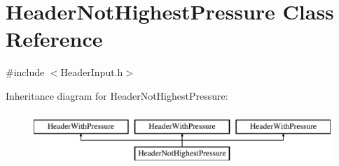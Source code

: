 \hypertarget{class_header_not_highest_pressure}{}\section{Header\+Not\+Highest\+Pressure Class Reference}
\label{class_header_not_highest_pressure}


{\ttfamily \#include $<$Header\+Input.\+h$>$}

Inheritance diagram for Header\+Not\+Highest\+Pressure\+:\begin{figure}[H]
\begin{center}
\leavevmode
\includegraphics[height=2.000000cm]{d8/d22/class_header_not_highest_pressure}
\end{center}
\end{figure}
